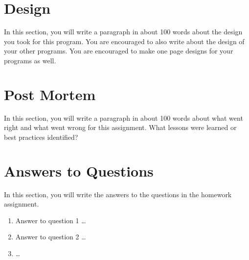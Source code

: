 \documentclass[12pt]{article}
\begin{document}

\section{Design}

In this section, you will write a paragraph in about 100 words about the design you took for this program. You are encouraged to also write about the design of your other programs. You are encouraged to make one page designs for your programs as well.





\section{Post Mortem}

In this section, you will write a paragraph in about 100 words about what went right and what went wrong for this assignment. What lessons were learned or best practices identified?





\section{Answers to Questions}

In this section, you will write the answers to the questions in the homework assignment.

\begin{enumerate}
    \item Answer to question 1 \ldots
    \item Answer to question 2 \ldots
    \item \ldots
\end{enumerate}




\end{document}
